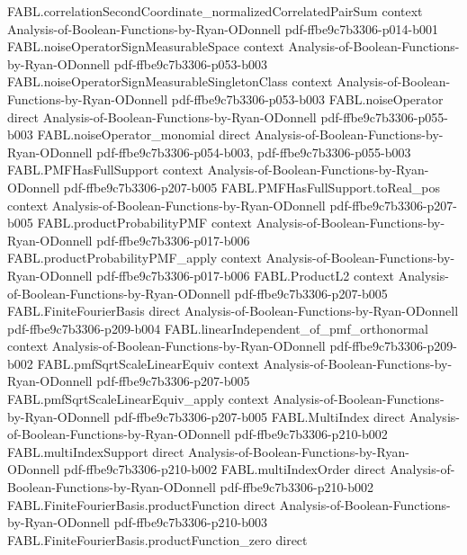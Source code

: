 \begin{theorem}
  {FABL.correlationSecondCoordinate_normalizedCorrelatedPairSum}
  {context}
  {Analysis-of-Boolean-Functions-by-Ryan-ODonnell}
  {pdf-ffbe9c7b3306-p014-b001}
\proofstep
  {FABL.noiseOperatorSignMeasurableSpace}
  {context}
  {Analysis-of-Boolean-Functions-by-Ryan-ODonnell}
  {pdf-ffbe9c7b3306-p053-b003}
\proofstep
  {FABL.noiseOperatorSignMeasurableSingletonClass}
  {context}
  {Analysis-of-Boolean-Functions-by-Ryan-ODonnell}
  {pdf-ffbe9c7b3306-p053-b003}
\proofstep
  {FABL.noiseOperator}
  {direct}
  {Analysis-of-Boolean-Functions-by-Ryan-ODonnell}
  {pdf-ffbe9c7b3306-p055-b003}
\proofstep
  {FABL.noiseOperator_monomial}
  {direct}
  {Analysis-of-Boolean-Functions-by-Ryan-ODonnell}
  {pdf-ffbe9c7b3306-p054-b003,
    pdf-ffbe9c7b3306-p055-b003}
\proofstep
  {FABL.PMFHasFullSupport}
  {context}
  {Analysis-of-Boolean-Functions-by-Ryan-ODonnell}
  {pdf-ffbe9c7b3306-p207-b005}
\proofstep
  {FABL.PMFHasFullSupport.toReal_pos}
  {context}
  {Analysis-of-Boolean-Functions-by-Ryan-ODonnell}
  {pdf-ffbe9c7b3306-p207-b005}
\proofstep
  {FABL.productProbabilityPMF}
  {context}
  {Analysis-of-Boolean-Functions-by-Ryan-ODonnell}
  {pdf-ffbe9c7b3306-p017-b006}
\proofstep
  {FABL.productProbabilityPMF_apply}
  {context}
  {Analysis-of-Boolean-Functions-by-Ryan-ODonnell}
  {pdf-ffbe9c7b3306-p017-b006}
\proofstep
  {FABL.ProductL2}
  {context}
  {Analysis-of-Boolean-Functions-by-Ryan-ODonnell}
  {pdf-ffbe9c7b3306-p207-b005}
\proofstep
  {FABL.FiniteFourierBasis}
  {direct}
  {Analysis-of-Boolean-Functions-by-Ryan-ODonnell}
  {pdf-ffbe9c7b3306-p209-b004}
\proofstep
  {FABL.linearIndependent_of_pmf_orthonormal}
  {context}
  {Analysis-of-Boolean-Functions-by-Ryan-ODonnell}
  {pdf-ffbe9c7b3306-p209-b002}
\proofstep
  {FABL.pmfSqrtScaleLinearEquiv}
  {context}
  {Analysis-of-Boolean-Functions-by-Ryan-ODonnell}
  {pdf-ffbe9c7b3306-p207-b005}
\proofstep
  {FABL.pmfSqrtScaleLinearEquiv_apply}
  {context}
  {Analysis-of-Boolean-Functions-by-Ryan-ODonnell}
  {pdf-ffbe9c7b3306-p207-b005}
\proofstep
  {FABL.MultiIndex}
  {direct}
  {Analysis-of-Boolean-Functions-by-Ryan-ODonnell}
  {pdf-ffbe9c7b3306-p210-b002}
\proofstep
  {FABL.multiIndexSupport}
  {direct}
  {Analysis-of-Boolean-Functions-by-Ryan-ODonnell}
  {pdf-ffbe9c7b3306-p210-b002}
\proofstep
  {FABL.multiIndexOrder}
  {direct}
  {Analysis-of-Boolean-Functions-by-Ryan-ODonnell}
  {pdf-ffbe9c7b3306-p210-b002}
\proofstep
  {FABL.FiniteFourierBasis.productFunction}
  {direct}
  {Analysis-of-Boolean-Functions-by-Ryan-ODonnell}
  {pdf-ffbe9c7b3306-p210-b003}
\proofstep
  {FABL.FiniteFourierBasis.productFunction_zero}
  {direct}

\end{theorem}
